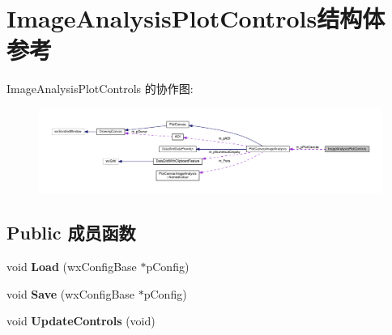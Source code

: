 \hypertarget{struct_image_analysis_plot_controls}{\section{Image\+Analysis\+Plot\+Controls结构体 参考}
\label{struct_image_analysis_plot_controls}
}


Image\+Analysis\+Plot\+Controls 的协作图\+:
\nopagebreak
\begin{figure}[H]
\begin{center}
\leavevmode
\includegraphics[width=350pt]{struct_image_analysis_plot_controls__coll__graph}
\end{center}
\end{figure}
\subsection*{Public 成员函数}
\begin{DoxyCompactItemize}
\item 
\hypertarget{struct_image_analysis_plot_controls_a5655226d1e296d12a9a096541d153f4e}{void {\bfseries Load} (wx\+Config\+Base $\ast$p\+Config)}\label{struct_image_analysis_plot_controls_a5655226d1e296d12a9a096541d153f4e}

\item 
\hypertarget{struct_image_analysis_plot_controls_a3256c5eae99b1af70a7a5b437c7d8e1f}{void {\bfseries Save} (wx\+Config\+Base $\ast$p\+Config)}\label{struct_image_analysis_plot_controls_a3256c5eae99b1af70a7a5b437c7d8e1f}

\item 
\hypertarget{struct_image_analysis_plot_controls_a0e4c4e78cf93a58bf549c4b09f5d76d4}{void {\bfseries Update\+Controls} (void)}\label{struct_image_analysis_plot_controls_a0e4c4e78cf93a58bf549c4b09f5d76d4}

\end{DoxyCompactItemize}
